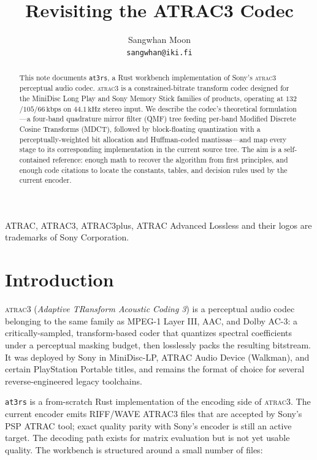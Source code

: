 \documentclass[11pt]{article}
\title{Revisiting the ATRAC3 Codec}
\author{Sangwhan Moon \\
  \texttt{sangwhan@iki.fi}
}
\begin{document}
\maketitle

\begin{abstract}
\noindent
This note documents \texttt{at3rs}, a Rust workbench implementation of Sony's
\textsc{atrac3} perceptual audio codec. \textsc{atrac3} is a constrained-bitrate
transform codec designed for the MiniDisc Long Play and Sony Memory Stick
families of products, operating at \(132\)/\(105\)/\(66\,\text{kbps}\) on
\(44.1\,\text{kHz}\) stereo input. We describe the codec's theoretical
formulation---a four-band quadrature mirror filter (QMF) tree feeding per-band
Modified Discrete Cosine Transforms (MDCT), followed by block-floating
quantization with a perceptually-weighted bit allocation and Huffman-coded
mantissas---and map every stage to its corresponding implementation in the
current source tree. The aim is a self-contained reference: enough math to
recover the algorithm from first principles, and enough code citations to
locate the constants, tables, and decision rules used by the current encoder.
\end{abstract}

\noindent\footnotesize
ATRAC, ATRAC3, ATRAC3plus, ATRAC Advanced Lossless and their logos are
trademarks of Sony Corporation.
\normalsize

\section{Introduction}
\label{sec:intro}

\textsc{atrac3} (\textit{Adaptive TRansform Acoustic Coding 3}) is a
perceptual audio codec belonging to the same family as MPEG-1 Layer III, AAC,
and Dolby AC-3: a critically-sampled, transform-based coder that quantizes
spectral coefficients under a perceptual masking budget, then losslessly
packs the resulting bitstream. It was deployed by Sony in MiniDisc-LP, ATRAC
Audio Device (Walkman), and certain PlayStation Portable titles, and remains
the format of choice for several reverse-engineered legacy toolchains.

\texttt{at3rs} is a from-scratch Rust implementation of the encoding side of
\textsc{atrac3}. The current encoder emits RIFF/WAVE ATRAC3 files that are
accepted by Sony's PSP ATRAC tool; exact quality parity with Sony's encoder is
still an active target. The decoding path exists for matrix evaluation but is
not yet usable quality. The workbench is structured around a small number of
files:
\end{document}
